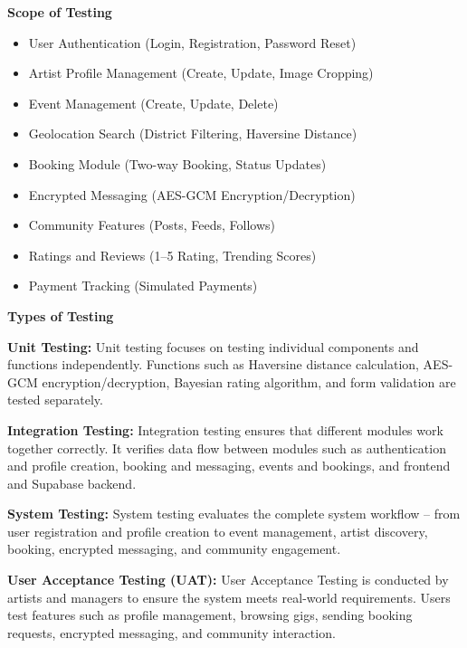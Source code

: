 \documentclass[12pt,a4paper]{report}
\begin{document}
\textbf{Scope of Testing}

\begin{itemize}
\item User Authentication (Login, Registration, Password Reset)
\item Artist Profile Management (Create, Update, Image Cropping)
\item Event Management (Create, Update, Delete)
\item Geolocation Search (District Filtering, Haversine Distance)
\item Booking Module (Two-way Booking, Status Updates)
\item Encrypted Messaging (AES-GCM Encryption/Decryption)
\item Community Features (Posts, Feeds, Follows)
\item Ratings and Reviews (1--5 Rating, Trending Scores)
\item Payment Tracking (Simulated Payments)
\end{itemize}

\textbf{Types of Testing}

\textbf{Unit Testing:}
Unit testing focuses on testing individual components and functions independently. Functions such as Haversine distance calculation, AES-GCM encryption/decryption, Bayesian rating algorithm, and form validation are tested separately.

\vspace{0.3cm}

\textbf{Integration Testing:}
Integration testing ensures that different modules work together correctly. It verifies data flow between modules such as authentication and profile creation, booking and messaging, events and bookings, and frontend and Supabase backend.

\vspace{0.3cm}

\textbf{System Testing:}
System testing evaluates the complete system workflow -- from user registration and profile creation to event management, artist discovery, booking, encrypted messaging, and community engagement.

\vspace{0.3cm}

\textbf{User Acceptance Testing (UAT):}
User Acceptance Testing is conducted by artists and managers to ensure the system meets real-world requirements. Users test features such as profile management, browsing gigs, sending booking requests, encrypted messaging, and community interaction.
\end{document}
